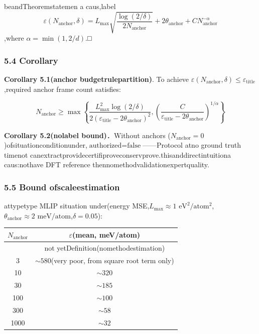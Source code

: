 \documentclass[
  12pt,
]{article}
\begin{document}
beandTheoremstatemen a caus,label
\[\varepsilon(N_{\text{anchor}}, \delta) = L_{\max} \sqrt{\frac{\log(2/\delta)}{2N_{\text{anchor}}}} + 2\theta_{\text{anchor}} + C N_{\text{anchor}}^{-\alpha}\],where
\(\alpha = \min(1, 2/d)\).□

\subsubsection{5.4 Corollary}\label{ux63a8ux8bba}

\textbf{Corollary 5.1(anchor budgetrulepartition)}. To achieve
\(\varepsilon(N_{\text{anchor}}, \delta) \le \varepsilon_{\text{title}}\),required anchor frame count satisfies:

\[N_{\text{anchor}} \ge \max\left\{ \frac{L_{\max}^2 \log(2/\delta)}{2(\varepsilon_{\text{title}} - 2\theta_{\text{anchor}})^2}, \left( \frac{C}{\varepsilon_{\text{title}} - 2\theta_{\text{anchor}}} \right)^{1/\alpha} \right\}\]

\textbf{Corollary 5.2(nolabel 
bound)}．Without anchors (\(N_{\text{anchor}} = 0\))ofsituationconditionunder,\(\text{authorized} = \text{false}\)------Protocol
atno ground truth timenot canextractprovidecertifiproveconservprove.thisanddirectintuitiona caus:nothave DFT
reference thennomethodvalidationexpertquality.

\subsubsection{5.5 Bound
ofscaleestimation}\label{bound-ux7684ux89c4ux6a21ux4f30ux8ba1}

attypetype MLIP situation under(energy
MSE,\(L_{\max} \approx 1\text{ eV}^2/\text{atom}^2\),\(\theta_{\text{anchor}} \approx 2\text{ meV/atom}\),\(\delta = 0.05\)):

\begin{longtable}[]{@{}cc@{}}
\toprule\noalign{}
\(N_{\text{anchor}}\) & \(\varepsilon\)(mean, meV/atom) \\
\midrule\noalign{}
\endhead
\bottomrule\noalign{}
\endlastfoot
1 & not yetDefinition(nomethodestimation) \\
3 & \(\sim 580\)(very poor, from square root term only) \\
10 & \(\sim 320\) \\
30 & \(\sim 185\) \\
100 & \(\sim 100\) \\
300 & \(\sim 58\) \\
1000 & \(\sim 32\) \\
\end{longtable}
\end{document}
